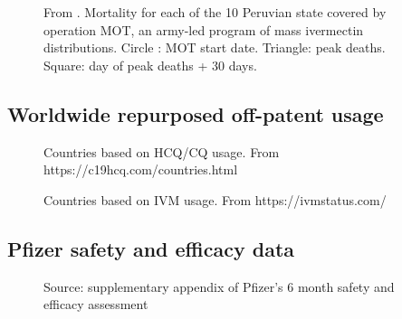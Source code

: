 \documentclass[11pt,a4paper,notitlepage]{report}
\begin{document}
\begin{figure}[h]
    \centering
    \caption{From \citet{Chamie2021}. Mortality for each of the 10 Peruvian state covered by operation MOT, an army-led program of mass ivermectin distributions. Circle : MOT start date. Triangle: peak deaths. Square: day of peak deaths + 30 days.}
    \label{fig:peru-operation-mot}
\end{figure}

\clearpage

\subsection*{Worldwide repurposed off-patent usage}

\begin{figure}[h]
    \centering
    \caption{Countries based on HCQ/CQ usage. From https://c19hcq.com/countries.html}
    \label{fig:hydroxychloroquine-countries}
\end{figure}

\begin{figure}[h]
    \centering
    \caption{Countries based on IVM usage. From https://ivmstatus.com/}
    \label{fig:ivermectin-countries}
\end{figure}

\clearpage

\subsection*{Pfizer safety and efficacy data}

\begin{figure}[h]
    \centering
    \caption{Source: supplementary appendix \cite{doi:10.1056/NEJMoa2110345-appendix} of Pfizer's 6 month safety and efficacy assessment \cite{doi:10.1056/NEJMoa2110345}}
    \label{fig:Pfizer-6-month-appendix}
\end{figure}
\end{document}
